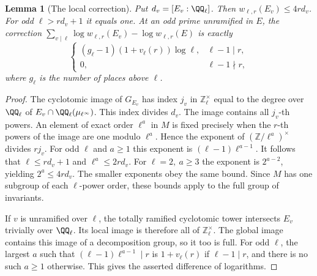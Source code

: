 \documentclass[a4paper,11pt]{article}
\newtheorem{lemma}[proposition]{Lemma}
\theoremstyle{definition}
\theoremstyle{remark}
\newcommand{\ZZ}{\mathbb Z}\newcommand{\ord}{\operatorname{ord}}
\numberwithin{equation}{section}
\begin{document}
\begin{lemma}[The local correction]\label{lem:loc98}
Put \(d_v=[E_v:\QQ_\ell]\). Then \(w_{\ell,r}(E_v)\le4rd_v\).
For odd \(\ell>rd_v+1\) it equals one. At an odd prime unramified
in \(E\), the correction
\(\sum_{v\mid\ell}\log w_{\ell,r}(E_v)-\log w_{\ell,r}(E)\)
is exactly
\[
 \begin{cases}
 (g_\ell-1)(1+v_\ell(r))\log\ell,&\ell-1\mid r,\\
 0,&\ell-1\nmid r ,
 \end{cases}
\]
where \(g_\ell\) is the number of places above \(\ell\).
\end{lemma}
\begin{proof}
The cyclotomic image of \(G_{E_v}\) has index \(j_v\) in
\(\ZZ_\ell^\times\) equal to the degree over \(\QQ_\ell\) of
\(E_v\cap\QQ_\ell(\mu_{\ell^\infty})\). This index divides \(d_v\).
The image contains all \(j_v\)-th powers. An element of exact
order \(\ell^a\) in \(M\) is fixed precisely when the \(r\)-th
powers of the image are one modulo \(\ell^a\). Hence the exponent
of \((\ZZ/\ell^a)^\times\) divides \(rj_v\). For odd \(\ell\)
and \(a\ge1\) this exponent is \((\ell-1)\ell^{a-1}\).
It follows that \(\ell\le rd_v+1\) and \(\ell^a\le2rd_v\).
For \(\ell=2,\ a\ge3\) the exponent is \(2^{a-2}\), yielding
\(2^a\le4rd_v\). The smaller exponents obey the same bound.
Since \(M\) has one subgroup of each \(\ell\)-power order,
these bounds apply to the full group of invariants.

If \(v\) is unramified over \(\ell\), the totally ramified
cyclotomic tower intersects \(E_v\) trivially over \(\QQ_\ell\).
Its local image is therefore all of \(\ZZ_\ell^\times\).
The global image contains this image of a decomposition group,
so it too is full. For odd \(\ell\), the largest \(a\) such that
\((\ell-1)\ell^{a-1}\mid r\) is \(1+v_\ell(r)\) if
\(\ell-1\mid r\), and there is no such \(a\ge1\) otherwise.
This gives the asserted difference of logarithms.
\end{proof}
\end{document}

